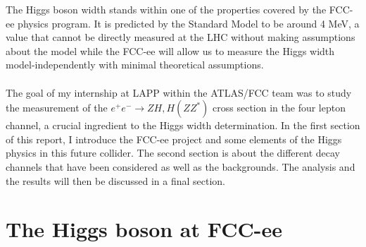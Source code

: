 \documentclass[a4paper,11pt]{article}
\begin{document}
	The Higgs boson width stands within one of the properties covered by the FCC-ee physics program. It is predicted by the Standard Model to be around 4 MeV, a value that cannot be directly measured at the LHC without making assumptions about the model while the FCC-ee will allow us to measure the Higgs width model-independently with minimal theoretical assumptions.\\\\
	The goal of my internship at \acrshort{LAPP} within the ATLAS/FCC team was to study the measurement of the $e^+e^-\rightarrow ZH,H(ZZ^*)$ cross section in the four lepton channel, a crucial ingredient to the Higgs width determination. In the first section of this report, I introduce the FCC-ee project and some elements of the Higgs physics in this future collider. The second section is about the different decay channels that have been considered as well as the backgrounds. The analysis and the results will then be discussed in a final section.
	
	\newpage
	\section{The Higgs boson at FCC-ee}
 
\end{document}
